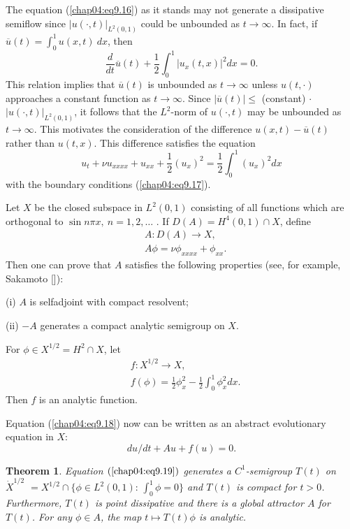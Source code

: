 \documentclass{surv-l}
\theoremstyle{plain}
\newtheorem{theorem}{Theorem}[section]
\theoremstyle{definition}
\numberwithin{equation}{section}
\numberwithin{figure}{chapter}
\begin{document}
The equation (\ref{chap04:eq9.16}) as it stands may not generate a dissipative semiflow since $|u(\cdot, t)|_{L^{2}(0,1)}$ could be unbounded as $t\rightarrow\infty$. In fact, if $\overline{u}(t)=\int_{0}^{1}u(x, t)\ dx$, then
\begin{equation*}
\frac{d}{dt}\overline{u}(t)+\frac{1}{2}\int_{0}^{1}|u_{x}(t, x)|^{2}dx=0.
\end{equation*}
This relation implies that $\overline{u}(t)$ is unbounded as $t\rightarrow\infty$ unless $u(t, \cdot)$ approaches a constant function as $t\rightarrow\infty$. Since $|\overline{u}(t)|\leq$ (constant) $\cdot$ $|u(\cdot, t)|_{L^{2}(0,1)}$, it follows that the $L^{2}$-norm of $u(\cdot, t)$ may be unbounded as $t\rightarrow\infty$. This motivates the consideration of the difference $u(x, t)-\overline{u}(t)$ rather than $u(t, x)$. This difference satisfies the equation
\begin{equation}\label{chap04:eq9.18}
u_{t}+\nu u_{xxxx}+u_{xx}+\frac{1}{2}(u_{x})^{2}=\frac{1}{2}\int_{0}^{1}(u_{x})^{2}dx
\end{equation}
with the boundary conditions (\ref{chap04:eq9.17}).

Let $X$ be the closed subspace in $L^{2}(0,1)$ consisting of all functions which are orthogonal to $\sin n\pi x,\ n=1,2,\ldots$ . If $D(A)=H^{4}(0,1) \cap X$, define
\begin{align*}
& A:D(A)\rightarrow X,\\
& A\phi=\nu\phi_{xxxx}+\phi_{xx}.
\end{align*}
Then one can prove that $A$ satisfies the following properties (see, for example, Sakamoto [\citeyear{1987s}]):

(i) $A$ is selfadjoint with compact resolvent;

(ii) $-A$ generates a compact analytic semigroup on $X$.

For $\phi\in X^{1/2}=H^{2}\cap X$, let
\begin{align*}
& f:X^{1/2}\rightarrow X,\\
& f(\phi)=\frac{1}{2}\phi_{x}^{2}-\frac{1}{2}\int_{0}^{1}\phi_{x}^{2}dx.
\end{align*}
Then $f$ is an analytic function.

Equation (\ref{chap04:eq9.18}) now can be written as an abstract evolutionary equation in $X$:
\begin{equation}\label{chap04:eq9.19}
du/dt + Au + f(u) = 0.
\end{equation}
\begin{theorem}\label{thm4.9.5} Equation $(\ref{chap04:eq9.19})$ generates a $C^{1}$-semigroup $T(t)$ on $\dot{X}^{1/2}$
$=X^{1/2}\cap\{\phi\in L^{2}(0,1){:}\,\int_{0}^{1}\phi=0\}$ and $T(t)$ is compact for $t>0$. Furthermore, $T(t)$ is point dissipative and there is a global attractor $A$ for $T(t)$. For any $\phi\in A$, the map $t\mapsto T(t)\phi$ is analytic.
\end{theorem}
\end{document}

